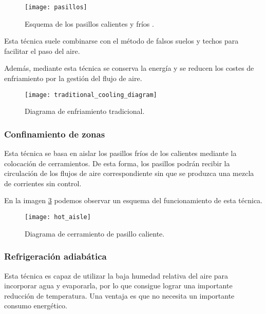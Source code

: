 \begin{figure}
    \begin{center}
        \label{pasillos}
        \texttt{[image: pasillos]}
        \caption{Esquema de los pasillos calientes y fríos \cite{Kelvion}.}
    \end{center}
\end{figure}

Esta técnica suele combinarse con el método de falsos suelos y techos para facilitar el paso del aire.

Además, mediante esta técnica se conserva la energía y se reducen los costes de enfriamiento por la gestión del flujo de aire.

\begin{figure}
    \begin{center}
        \label{traditional_cooling}
        \texttt{[image: traditional\_cooling\_diagram]}
        \caption{Diagrama de enfriamiento tradicional.}
    \end{center}
\end{figure}

\subsubsection{Confinamiento de zonas}

Esta técnica se basa en aislar los pasillos fríos de los calientes mediante la colocación de cerramientos. De esta forma, los pasillos podrán recibir la circulación de los flujos de aire correspondiente sin que se produzca una mezcla de corrientes sin control.

En la imagen \ref{hot_aisle} podemos observar un esquema del funcionamiento de esta técnica.

\begin{figure}
    \begin{center}
        \label{hot_aisle}
        \texttt{[image: hot\_aisle]}
        \caption{Diagrama de cerramiento de pasillo caliente.}
    \end{center}
\end{figure}

\subsubsection{Refrigeración adiabática}

Esta técnica es capaz de utilizar la baja humedad relativa del aire para incorporar agua y evaporarla, por lo que consigue lograr una importante reducción de temperatura. Una ventaja es que no necesita un importante consumo energético.

